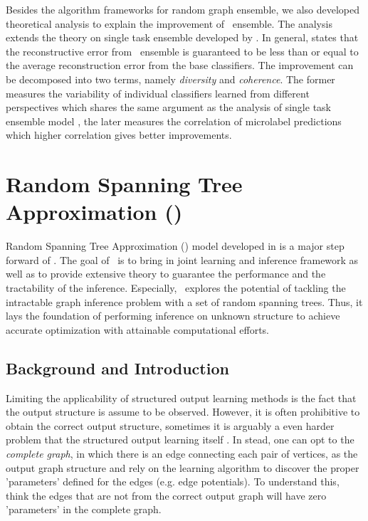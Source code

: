 {Besides the algorithm frameworks for random graph ensemble, we also developed theoretical analysis to explain the improvement of \mam\ ensemble.
The analysis extends the theory on single task ensemble developed by \citet{Brown10good}.
In general,  states that the reconstructive error from \mam\ ensemble is guaranteed to be less than or equal to the average reconstruction error from the base classifiers.
The improvement can be decomposed into two terms, namely \textit{diversity} and \textit{coherence}.
The former measures the variability of individual classifiers learned from different perspectives which shares the same argument as the analysis of single task ensemble model \citep{Brown10good}, the later measures the correlation of microlabel predictions which higher correlation gives better improvements.

%
%
\section{Random Spanning Tree Approximation (\rta)}\label{sc_su14c}

Random Spanning Tree Approximation (\rta) model developed in  is a major step forward of \mam.
The goal of \rta\ is to bring in joint learning and inference framework as well as to provide extensive theory to guarantee the performance and the tractability of the inference.
Especially, \rta\ explores the potential of tackling the intractable graph inference problem with a set of random spanning trees.
Thus, it lays the foundation of performing inference on unknown structure to achieve accurate optimization with attainable computational efforts.

\subsection{Background and Introduction}

Limiting the applicability of structured output learning methods is the fact that the output structure is assume to be observed.
However, it is often prohibitive to obtain the correct output structure, sometimes it is arguably a even harder problem that the structured output learning itself \citep{Chickering94learning}.
In stead, one can opt to the \textit{complete graph}, in which there is an edge connecting each pair of vertices, as the output graph structure and rely on the learning algorithm to discover the proper 'parameters' defined for the edges (e.g. edge potentials).
To understand this, think the edges that are not from the correct output graph will have zero 'parameters' in the complete graph.

}
